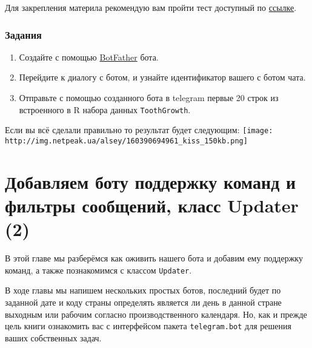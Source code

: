 \documentclass[
]{book}
\providecommand{\tightlist}{%
  \setlength{\itemsep}{0pt}\setlength{\parskip}{0pt}}
\begin{document}
Для закрепления материла рекомендую вам пройти тест доступный по \href{https://onlinetestpad.com/t/build-tg-bot-in-r-1}{ссылке}.

\hypertarget{ux437ux430ux434ux430ux43dux438ux44f}{%
\subsection{Задания}\label{ux437ux430ux434ux430ux43dux438ux44f}}

\begin{enumerate}
\def\labelenumi{\arabic{enumi}.}
\tightlist
\item
  Создайте с помощью \href{http://t.me/BotFather}{BotFather} бота.
\item
  Перейдите к диалогу с ботом, и узнайте идентификатор вашего с ботом чата.
\item
  Отправьте с помощью созданного бота в telegram первые 20 строк из встроенного в R набора данных \texttt{ToothGrowth}.
\end{enumerate}

Если вы всё сделали правильно то результат будет следующим:
\texttt{[image: http://img.netpeak.ua/alsey/160390694961\_kiss\_150kb.png]}

\hypertarget{ux434ux43eux431ux430ux432ux43bux44fux435ux43c-ux431ux43eux442ux443-ux43fux43eux434ux434ux435ux440ux436ux43aux443-ux43aux43eux43cux430ux43dux434-ux438-ux444ux438ux43bux44cux442ux440ux44b-ux441ux43eux43eux431ux449ux435ux43dux438ux439-ux43aux43bux430ux441ux441-updater-2}{%
\chapter{Добавляем боту поддержку команд и фильтры сообщений, класс Updater (2)}\label{ux434ux43eux431ux430ux432ux43bux44fux435ux43c-ux431ux43eux442ux443-ux43fux43eux434ux434ux435ux440ux436ux43aux443-ux43aux43eux43cux430ux43dux434-ux438-ux444ux438ux43bux44cux442ux440ux44b-ux441ux43eux43eux431ux449ux435ux43dux438ux439-ux43aux43bux430ux441ux441-updater-2}}

В этой главе мы разберёмся как оживить нашего бота и добавим ему поддержку команд, а также познакомимся с классом \texttt{Updater}.

В ходе главы мы напишем нескольких простых ботов, последний будет по заданной дате и коду страны определять является ли день в данной стране выходным или рабочим согласно производственного календаря. Но, как и прежде цель книги ознакомить вас с интерфейсом пакета \texttt{telegram.bot} для решения ваших собственных задач.
\end{document}
